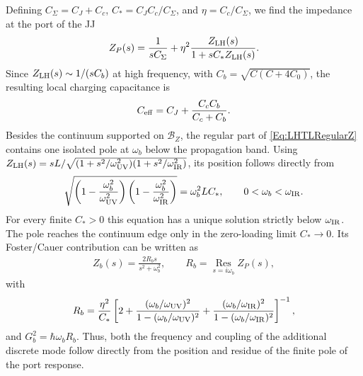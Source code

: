\documentclass[prx,aps,twocolumn,article]{revtex4-2}
\begin{document}
Defining $C_\Sigma=C_J+C_c$, $C_*=C_JC_c/C_\Sigma$, and
$\eta=C_c/C_\Sigma$, we find the impedance at the port of the \gls{JJ} 
\begin{align}
Z_P(s)
=
\frac{1}{sC_\Sigma}
+
\eta^2
\frac{Z_{\rm LH}(s)}
{1+sC_*Z_{\rm LH}(s)}.
\label{Eq:LHTLRegularZ}
\end{align}
Since $Z_{\rm LH}(s)\sim1/(sC_b)$ at high frequency, with
$C_b=\sqrt{C(C+4C_0)}$, the resulting local charging capacitance is 
\begin{align}
C_{\rm eff}
=
C_J+\frac{C_cC_b}{C_c+C_b}.
\label{Eq:LHTLCeff}
\end{align}
Besides the continuum supported on $\mathcal B_Z$, the regular part of
\cref{Eq:LHTLRegularZ} contains one isolated pole at $\omega_b$ below the
propagation band. Using
$Z_{\rm LH}(s)
=sL/\sqrt{(1+s^2/\omega_{\rm UV}^2)
(1+s^2/\omega_{\rm IR}^2)}$, its position follows directly from
\begin{align}
\sqrt{
\left(1-\frac{\omega_b^2}{\omega_{\rm UV}^2}\right)
\left(1-\frac{\omega_b^2}{\omega_{\rm IR}^2}\right)
}
=
\omega_b^2LC_*,
\qquad
0<\omega_b<\omega_{\rm IR}.
\label{Eq:LHTLBoundPole}
\end{align}
For every finite $C_*>0$ this equation has a unique solution strictly
below $\omega_{\rm IR}$. The pole reaches the continuum edge only in the zero-loading limit $C_*\rightarrow0$. Its Foster/Cauer contribution can be written as
\begin{align}
Z_b(s)
=
\frac{2R_b s}{s^2+\omega_b^2},
\qquad
R_b
=
\operatorname*{Res}_{s=i\omega_b}Z_P(s),
\label{Eq:LHTLBoundPoleFoster}
\end{align}
with
\begin{align}
R_b
=
\frac{\eta^2}{C_*}
\left[
2
+
\frac{
(\omega_b/\omega_{\rm UV})^2
}{
1-(\omega_b/\omega_{\rm UV})^2
}
+
\frac{
(\omega_b/\omega_{\rm IR})^2
}{
1-(\omega_b/\omega_{\rm IR})^2
}
\right]^{-1},
\label{Eq:LHTLBoundCoupling}
\end{align}
and $G_b^2=\hbar\omega_bR_b$. Thus, both the frequency and coupling of the additional discrete mode
follow directly from the position and residue of the finite pole of the
port response.
\end{document}
